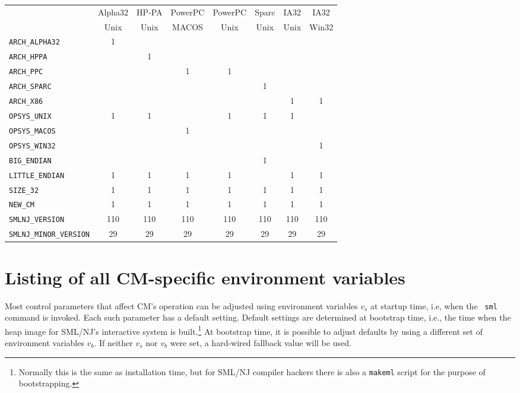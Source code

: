 \documentclass[titlepage,letterpaper]{article}
\newcommand{\smlmj}{110}
\newcommand{\smlmn}{29}
\begin{document}
\begin{center}
\begin{tabular}{l||c|c|c|c|c|c|c}
   & Alpha32 & HP-PA & PowerPC & PowerPC & Sparc & IA32 & IA32 \\
   & Unix & Unix & MACOS & Unix & Unix & Unix & Win32 \\
\hline \hline
{\tt ARCH\_ALPHA32}  & 1 & & & & & & \\
{\tt ARCH\_HPPA}     & & 1 & & & & & \\
{\tt ARCH\_PPC}      & & & 1 & 1 & & & \\
{\tt ARCH\_SPARC}    & & & & & 1 & & \\
{\tt ARCH\_X86}      & & & & & & 1 & 1 \\
{\tt OPSYS\_UNIX}    & 1 & 1 & & 1 & 1 & 1 & \\
{\tt OPSYS\_MACOS}   & & & 1 & & & & \\
{\tt OPSYS\_WIN32}   & & & & & & & 1 \\
{\tt BIG\_ENDIAN}    & & & & & 1 & & \\
{\tt LITTLE\_ENDIAN} & 1 & 1 & 1 & 1 & & 1 & 1 \\
{\tt SIZE\_32}       & 1 & 1 & 1 & 1 & 1 & 1 & 1 \\
{\tt NEW\_CM}        & 1 & 1 & 1 & 1 & 1 & 1 & 1 \\
{\tt SMLNJ\_VERSION} & \smlmj & \smlmj & \smlmj & \smlmj & \smlmj & \smlmj & \smlmj \\
{\tt SMLNJ\_MINOR\_VERSION} & \smlmn & \smlmn & \smlmn & \smlmn & \smlmn & \smlmn & \smlmn
\end{tabular}
\end{center}

\section{Listing of all CM-specific environment variables}

Most control parameters that affect CM's operation can be adjusted
using environment variables $v_s$ at startup time, i.e, when the {\tt
sml} command is invoked.  Each such parameter has a default setting.
Default settings are determined at bootstrap time, i.e., the time when
the heap image for SML/NJ's interactive system is
built.\footnote{Normally this is the same as installation time, but
for SML/NJ compiler hackers there is also a {\tt makeml} script for the
purpose of bootstrapping.}  At bootstrap time, it is possible to
adjust defaults by using a different set of environment variables
$v_b$.  If neither $v_s$ nor $v_b$ were set, a hard-wired fallback
value will be used.
\end{document}
